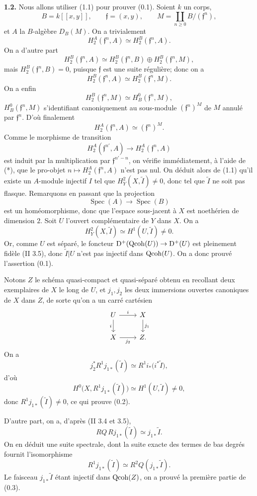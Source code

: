 \documentclass[11pt]{article}
\newcommand{\Spec}{\operatorname{Spec}}
\begin{document}
\textbf{1.2.} Nous allons utiliser (1.1) pour prouver (0.1). Soient $k$ un corps,
\[
B=k[[x,y]],\qquad \mathfrak f=(x,y),\qquad
M=\coprod_{n\geq0} B/(\mathfrak f^n),
\]
et $A$ la $B$-algèbre $D_B(M)$. On a trivialement
\[
H^A_2(\mathfrak f^n,A)\simeq H^B_2(\mathfrak f^n,A).
\]
On a d'autre part
\[
H^B_2(\mathfrak f^n,A)\simeq H^B_2(\mathfrak f^n,B)\oplus H^B_2(\mathfrak f^n,M),
\]
mais $H^B_2(\mathfrak f^n,B)=0$, puisque $\mathfrak f$ est une suite régulière; donc on a
\[
H^B_2(\mathfrak f^n,A)\simeq H^B_2(\mathfrak f^n,M).
\]
On a enfin
\[
H^B_2(\mathfrak f^n,M)\simeq H^0_B(\mathfrak f^n,M),
\]
$H^0_B(\mathfrak f^n,M)$ s'identifiant canoniquement au sous-module $(\mathfrak f^n)^M$ de $M$ annulé par $\mathfrak f^n$. D'où finalement
\begin{equation}\tag{*}
H^A_2(\mathfrak f^n,A)\simeq (\mathfrak f^n)^M.
\end{equation}
Comme le morphisme de transition
\[
H^A_2(\mathfrak f^{n'},A)\longrightarrow H^A_2(\mathfrak f^n,A)
\]
est induit par la multiplication par $\mathfrak f^{n'-n}$, on vérifie immédiatement, à l'aide de (*), que le pro-objet $n\mapsto H^A_2(\mathfrak f^n,A)$ n'est pas nul. On déduit alors de (1.1) qu'il existe un $A$-module injectif $I$ tel que $H_Y^2(X,\widetilde I)\neq0$, donc tel que $\widetilde I$ ne soit pas flasque. Remarquons en passant que la projection
\[
\Spec(A)\longrightarrow\Spec(B)
\]
est un homéomorphisme, donc que l'espace sous-jacent à $X$ est noethérien de dimension $2$. Soit $U$ l'ouvert complémentaire de $Y$ dans $X$. On a
\[
H_Y^2(X,\widetilde I)\simeq H^1(U,\widetilde I)\neq0.
\]
Or, comme $U$ est séparé, le foncteur $\mathrm D^+(\operatorname{Qcoh}(U))\to\mathrm D^+(U)$ est pleinement fidèle (II 3.5), donc $\widetilde I|U$ n'est pas injectif dans $\operatorname{Qcoh}(U)$. On a donc prouvé l'assertion (0.1).

Notons $Z$ le schéma quasi-compact et quasi-séparé obtenu en recollant deux exemplaires de $X$ le long de $U$, et $j_1,j_2$ les deux immersions ouvertes canoniques de $X$ dans $Z$, de sorte qu'on a un carré cartésien
\[
\begin{tikzcd}
U \arrow[r,"i"] \arrow[d,"i"'] & X \arrow[d,"j_1"]\\
X \arrow[r,"j_2"'] & Z .
\end{tikzcd}
\]
On a
\[
j_2^*R^1j_{1*}(\widetilde I)\simeq R^1i_*\bigl(i^*\widetilde I\bigr),
\]
d'où
\[
H^0\bigl(X,R^1j_{1*}(\widetilde I)\bigr)\simeq H^1(U,\widetilde I)\neq0,
\]
donc $R^1j_{1*}(\widetilde I)\neq0$, ce qui prouve (0.2).

D'autre part, on a, d'après (II 3.4 et 3.5),
\[
RQ\,Rj_{1*}(\widetilde I)\simeq j_{1*}\widetilde I.
\]
On en déduit une suite spectrale, dont la suite exacte des termes de bas degrés fournit l'isomorphisme
\[
R^1j_{1*}(\widetilde I)\simeq R^2Q(j_{1*}\widetilde I).
\]
Le faisceau $j_{1*}\widetilde I$ étant injectif dans $\operatorname{Qcoh}(Z)$, on a prouvé la première partie de (0.3).
\end{document}
